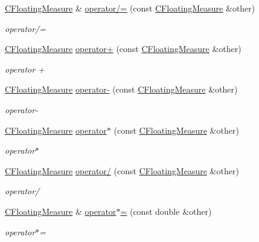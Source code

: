\begin{DoxyCompactItemize}
\hyperlink{classCFloatingMeasure}{C\+Floating\+Measure} \& \hyperlink{classCFloatingMeasure_a1bc972be1fa5abd0619849710eef398c}{operator/=} (const \hyperlink{classCFloatingMeasure}{C\+Floating\+Measure} \&other)
\begin{DoxyCompactList}\small\item\em operator/= \end{DoxyCompactList}\item 
\hyperlink{classCFloatingMeasure}{C\+Floating\+Measure} \hyperlink{classCFloatingMeasure_a26560fcb587eafe8966541159eec57de}{operator+} (const \hyperlink{classCFloatingMeasure}{C\+Floating\+Measure} \&other)
\begin{DoxyCompactList}\small\item\em operator + \end{DoxyCompactList}\item 
\hyperlink{classCFloatingMeasure}{C\+Floating\+Measure} \hyperlink{classCFloatingMeasure_ad29973f56a38dda22fc9d66a16b13860}{operator-\/} (const \hyperlink{classCFloatingMeasure}{C\+Floating\+Measure} \&other)
\begin{DoxyCompactList}\small\item\em operator-\/ \end{DoxyCompactList}\item 
\hyperlink{classCFloatingMeasure}{C\+Floating\+Measure} \hyperlink{classCFloatingMeasure_a993623835ced24f74075861b2aab736e}{operator$\ast$} (const \hyperlink{classCFloatingMeasure}{C\+Floating\+Measure} \&other)
\begin{DoxyCompactList}\small\item\em operator$\ast$ \end{DoxyCompactList}\item 
\hyperlink{classCFloatingMeasure}{C\+Floating\+Measure} \hyperlink{classCFloatingMeasure_acb68f4d17606dc2312f4efabe877ab80}{operator/} (const \hyperlink{classCFloatingMeasure}{C\+Floating\+Measure} \&other)
\begin{DoxyCompactList}\small\item\em operator/ \end{DoxyCompactList}\item 
\hyperlink{classCFloatingMeasure}{C\+Floating\+Measure} \& \hyperlink{classCFloatingMeasure_a051879dde322060eb7695667dd38ab13}{operator$\ast$=} (const double \&other)
\begin{DoxyCompactList}\small\item\em operator$\ast$= \end{DoxyCompactList}\item 

\end{DoxyCompactItemize}
